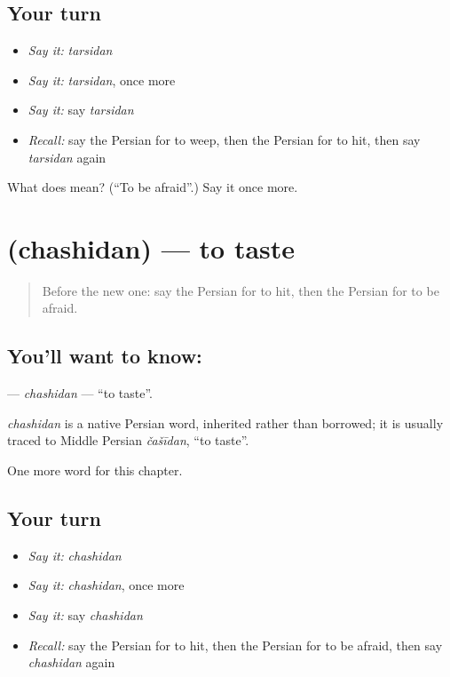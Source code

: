 \subsection*{Your turn}
\begin{itemize}
\raggedright
  \item \emph{Say it:} \emph{tarsidan}
  \item \emph{Say it:} \emph{tarsidan}, once more
  \item \emph{Say it:} say \emph{tarsidan}
  \item \emph{Recall:} say the Persian for to weep, then the Persian for to hit, then say \emph{tarsidan} again
\end{itemize}

\begin{tcolorbox}[breakable,colback=teal!4,colframe=teal!35!black,title={Before you move on}]
What does  mean? (\textquotedblleft{}To be afraid\textquotedblright{}.) Say it once more.
\end{tcolorbox}
\section[\texorpdfstring{\fa{چشیدن} (chashidan)}{چشیدن (chashidan)}]{ (chashidan) — to taste}

\label{lesson:FA-C134-chashidan}



\begin{quote}
Before the new one: say the Persian for to hit, then the Persian for to be afraid.
\end{quote}

\subsection*{You'll want to know: }
\textbf{} — \emph{chashidan} — \textquotedblleft{}to taste\textquotedblright{}.

\begin{cousinweb}
\emph{chashidan} is a native Persian word, inherited rather than borrowed; it is usually traced to Middle Persian \emph{čašīdan}, \textquotedblleft{}to taste\textquotedblright{}.
\end{cousinweb}

\begin{grammarlens}[title={What you've built}]
One more word for this chapter.
\end{grammarlens}

\subsection*{Your turn}
\begin{itemize}
\raggedright
  \item \emph{Say it:} \emph{chashidan}
  \item \emph{Say it:} \emph{chashidan}, once more
  \item \emph{Say it:} say \emph{chashidan}
  \item \emph{Recall:} say the Persian for to hit, then the Persian for to be afraid, then say \emph{chashidan} again
\end{itemize}

